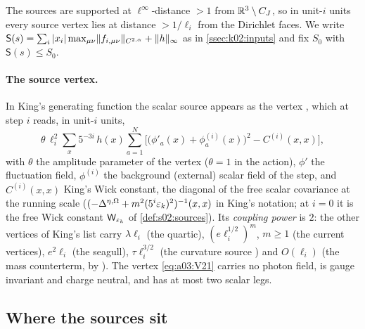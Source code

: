 The sources are supported at $\ell^\infty$-distance $>1$ from $\mathbb R^3\setminus C_J$, so in unit-$i$ units every source vertex lies at distance $>1/\ell_i$ from the Dirichlet faces. We write $\mathsf S(s)=\sum_i|x_i|\max_{\mu\nu}\lVert f_{i,\mu\nu}\rVert_{C^{2,\alpha}}+\lVert h\rVert_\infty$ as in \cref{ssec:k02:inputs} and fix $S_0$ with $\mathsf S(s)\le S_0$.

\paragraph{The source vertex.} In King's generating function \cite[(3.17)]{K1} the scalar source appears as the vertex \cite[(3.21)]{K1}, which at step $i$ reads, in unit-$i$ units,
\begin{equation}\label{eq:a03:V21}
\theta\,\ell_i^{2}\sum_{x}5^{-3i}\,h(x)\sum_{a=1}^{N}\Big[\big(\phi'_a(x)+\phi^{(i)}_a(x)\big)^2-C^{(i)}(x,x)\Big],
\end{equation}
with $\theta$ the amplitude parameter of the vertex ($\theta=1$ in the action), $\phi'$ the fluctuation field, $\phi^{(i)}$ the background (external) scalar field of the step, and $C^{(i)}(x,x)$ King's Wick constant, the diagonal of the free scalar covariance at the running scale ($(-\Delta^{\eta,\Omega}+m^2(5^i\varepsilon_k)^2)^{-1}(x,x)$ in King's notation; at $i=0$ it is the free Wick constant $\mathsf W_{\varepsilon_k}$ of \cref{def:s02:sources}). Its \emph{coupling power} is $2$: the other vertices of King's list \cite[(3.18)--(3.26)]{K1} carry $\lambda\ell_i$ (the quartic), $(e\ell_i^{1/2})^m$, $m\ge1$ (the current vertices), $e^2\ell_i$ (the seagull), $\tau\ell_i^{3/2}$ (the curvature source \cite[(3.20)]{K1}) and $O(\ell_i)$ (the mass counterterm, by \cite[(1.29)]{Ba3}). The vertex \eqref{eq:a03:V21} carries no photon field, is gauge invariant and charge neutral, and has at most two scalar legs.

\subsection{Where the sources sit}\label{ssec:a03:A}

